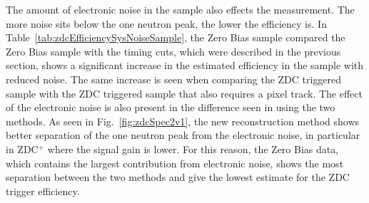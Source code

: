      The amount of electronic noise in the sample also effects the measurement.
      The more noise sits below the one neutron peak, the lower the efficiency 
        is. 
      In Table~\ref{tab:zdcEfficiencySysNoiseSample}, the Zero Bias sample 
        compared the Zero Bias sample with the timing cuts, which were 
        described in the previous section, shows a significant increase in 
        the estimated efficiency in the sample with reduced noise. 
      The same increase is seen when comparing the ZDC triggered sample with 
        the ZDC triggered sample that also requires a pixel track. 
      The effect of the electronic noise is also present in the difference seen
        in using the two methods.
      As seen in Fig.~\ref{fig:zdcSpec2v1}, the new reconstruction method 
        shows better separation of the one neutron peak from the electronic 
        noise, in particular in ZDC$^{+}$ where the signal gain is lower.
      For this reason, the Zero Bias data, which contains the largest 
        contribution from electronic noise, shows the most separation between 
        the two methods and give the lowest estimate for the ZDC trigger 
        efficiency.

